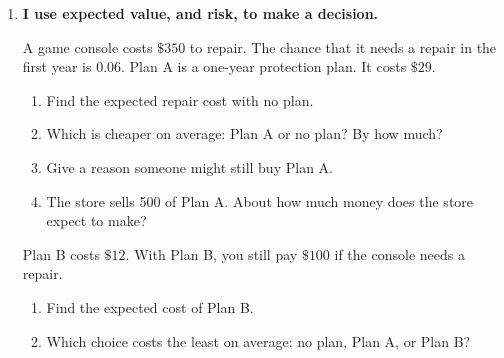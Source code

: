 \documentclass[11pt]{article}
\newcommand{\goal}[1]{\textbf{#1}\par\vspace{0.35em}}
\begin{document}
\begin{enumerate}[resume]
\begin{enumerate}[start=5,itemsep=1em]
  \work{2.5em}
  \item Is the game fair? Should a player expect to win money?

  \work{2em}
  \item The school wants to make $\$1$ per player, on average. How much should a spin cost?

  \work{3em}
\end{enumerate}

\newpage
\item \goal{I use expected value, and risk, to make a decision.}
A game console costs $\$350$ to repair. The chance that it needs a repair in the first year is 0.06. Plan A is a one-year protection plan. It costs $\$29$.
\begin{enumerate}[itemsep=1em]
  \item Find the expected repair cost with no plan. 
  \work{2em}
  \item Which is cheaper on average: Plan A or no plan? By how much?

  \work{2em}
  \item Give a reason someone might still buy Plan A.

  \work{2em}
  \item The store sells 500 of Plan A. About how much money does the store expect to make?

  \work{2.5em}
\end{enumerate}

\vspace{0.4em}
Plan B costs $\$12$. With Plan B, you still pay $\$100$ if the console needs a repair.
\begin{enumerate}[start=5,itemsep=1em]
  \item Find the expected cost of Plan B.

  \work{3em}
  \item Which choice costs the least on average: no plan, Plan A, or Plan B?


\end{enumerate}
\end{enumerate}
\end{document}

